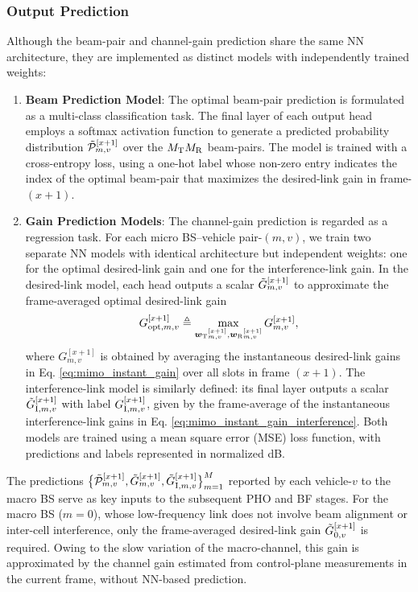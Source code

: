 \documentclass[conference, a4paper]{IEEEtran}
\theoremstyle{remark}
\begin{document}
\subsubsection{Output Prediction}

Although the beam-pair and channel-gain prediction share the same NN architecture, they are implemented as distinct models with independently trained weights:
\begin{enumerate}[label=\arabic*.]
    \item \textbf{Beam Prediction Model}: The optimal beam-pair prediction is formulated as a multi-class classification task. The final layer of each output head employs a softmax activation function to generate a predicted probability distribution $\Tilde{\mathcal{P}}_{m,v}^{[x+1]}$ over the $M_{\rm T}M_{\rm R}$ beam-pairs. 
    The model is trained with a cross-entropy loss, using a one-hot label whose non-zero entry indicates the index of the optimal beam-pair that
    maximizes the desired-link gain in frame-$(x\!+\!1)$.
    
    \item \textbf{Gain Prediction Models}: The channel-gain prediction is regarded as a regression task. For each micro BS–vehicle pair-$(m,v)$, we train two separate NN models with identical architecture but independent weights: one for the {optimal desired-link} gain and one for the {interference-link} gain. 
    In the desired-link model, each head outputs a scalar $\Tilde{G}_{m,v}^{[x+1]}$ to approximate the frame-averaged optimal desired-link gain
    \begin{equation}
        G_{{\rm opt},m,v}^{[x+1]}
        \triangleq
        \max_{{\bm{w}_{\rm T}}_{m,v}^{[x+1]},
              {\bm{w}_{\rm R}}_{m,v}^{[x+1]}} G_{m,v}^{[x+1]},
    \end{equation}
    where $G_{m,v}^{[x+1]}$ is obtained by averaging the instantaneous desired-link gains in Eq. \eqref{eq:mimo_instant_gain} over all slots in frame $(x\!+\!1)$.
    The interference-link model is similarly defined: its final layer outputs a scalar $\Tilde{G}_{{\rm I},m,v}^{[x+1]}$ with label $G_{{\rm I},m,v}^{[x+1]}$, given by the frame-average of the instantaneous interference-link gains in Eq. \eqref{eq:mimo_instant_gain_interference}. 
    Both models are trained using a mean square error (MSE) loss function, with predictions and labels represented in normalized dB.
\end{enumerate}

The predictions $\bigl\{\Tilde{\mathcal{P}}_{m,v}^{[x+1]}, \Tilde{G}_{m,v}^{[x+1]}, \Tilde{G}_{{\rm I},m,v}^{[x+1]}\bigr\}_{m=1}^M$ reported by each vehicle-$v$ to the macro BS serve as key inputs to the subsequent PHO and BF stages. For the macro BS ($m=0$), whose low-frequency link does not involve beam alignment or inter-cell interference, only the frame-averaged desired-link gain $\Tilde{G}_{0,v}^{[x+1]}$ is required. Owing to the slow variation of the macro-channel, this gain is approximated by the channel gain estimated from control-plane measurements in the current frame, without NN-based prediction.
\end{document}
